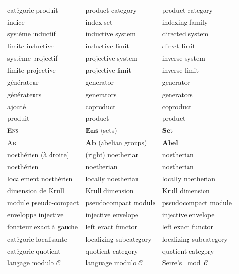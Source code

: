 \begin{table}[htbp]
\begin{tabular}{p{} p{} p{}}
    catégorie produit           & product category             & product category\\
    indice                      & index set                    & indexing family\\
    système inductif            & inductive system             & directed system\\
    limite inductive            & inductive limit              & direct limit\\
    système projectif           & projective system            & inverse system\\
    limite projective            & projective limit             & inverse limit\\
    générateur                  & generator                    & generator\\
    générateurs                 & generators                   & generators\\
    ajouté                      & coproduct                    & coproduct\\
    produit                     & product                     & product\\
    \textsc{Ens}                & $\mathbf{Ens}$ (sets)        & $\mathbf{Set}$\\
    \textsc{Ab}                 & $\mathbf{Ab}$ (abelian groups) & $\mathbf{Abel}$\\
    noethérien (à droite)       & (right) noetherian           & noetherian\\
    noethérien                  & noetherian                   & noetherian\\
    localement noethérien       & locally noetherian          & locally noetherian\\
    dimension de Krull          & Krull dimension             & Krull dimension\\
    module pseudo-compact       & pseudocompact module         & pseudocompact module\\
    enveloppe injective         & injective envelope           & injective envelope\\
    foncteur exact à gauche    & left exact functor           & left exact functor\\
    catégorie localisante       & localizing subcategory      & localizing subcategory\\
    catégorie quotient          & quotient category            & quotient category\\
    langage modulo $\mathcal{C}$& language modulo $\mathcal{C}$ & Serre's $\bmod \mathcal{C}$\\

\end{tabular}
\end{table}
